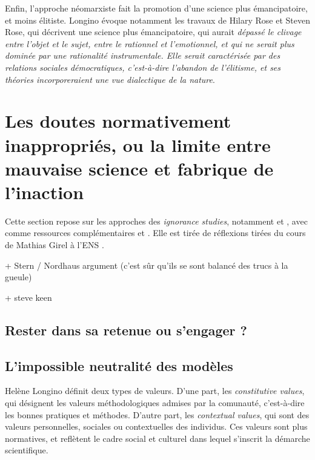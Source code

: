 Enfin, l'approche néomarxiste fait la promotion d'une science plus émancipatoire, et moins élitiste. Longino évoque notamment les travaux de Hilary Rose et Steven Rose, qui décrivent une science plus émancipatoire, qui aurait \emph{dépassé le clivage entre l'objet et le sujet, entre le rationnel et l'emotionnel, et qui ne serait plus dominée par une rationalité instrumentale. Elle serait caractérisée par des relations sociales démocratiques, c'est-à-dire l'abandon de l'élitisme, et ses théories incorporeraient une vue dialectique de la nature}.



\section{Les doutes normativement inappropriés, ou la limite entre mauvaise science et fabrique de l'inaction}

Cette section repose sur les approches des \textit{ignorance studies}, notamment \cite{melo-martin_fight_2018} et \cite{gross_routledge_2015}, avec comme ressources complémentaires \cite{noauthor_carnet_2024} et \cite{proctor_agnotology_2008}. Elle est tirée de réflexions tirées du cours de Mathias Girel à l'ENS \cite{girel_vertus_2023}. 



+ Stern / Nordhaus argument (c'est sûr qu'ils se sont balancé des trucs à la gueule) 

+ steve keen \cite{keen_appallingly_2021}

\subsection{Rester dans sa retenue ou s'engager ?}

\subsection{L'impossible neutralité des modèles}

Helène Longino définit deux types de valeurs. D'une part, les \emph{constitutive values}, qui désignent les valeurs méthodologiques admises par la comunauté, c'est-à-dire les bonnes pratiques et méthodes. D'autre part, les \emph{contextual values}, qui sont des valeurs personnelles, sociales ou contextuelles des individus. Ces valeurs sont plus normatives, et reflètent le cadre social et culturel dans lequel s'inscrit la démarche scientifique. \\

